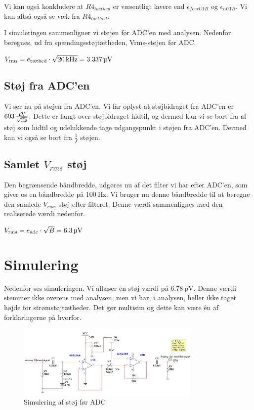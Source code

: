 \documentclass[a4paper, 11pt, article,oneside,openany]{memoir} %
\newcommand{\tsub}[1]{_{\textup{#1}}}
\begin{document}
Vi kan også konkludere at $R4_{taethed}$ er væsentligt lavere end $\epsilon_{foerU1B}$ og $\epsilon_{nU1B}$. Vi kan altså også se væk fra $R4_{taethed}$.

I simuleringen sammenligner vi støjen før ADC'en med analysen. Nedenfor beregnes, ud fra spændingsstøjtætheden, Vrms-støjen før ADC.

$V\tsub{rms} = e\tsub{tæthed} \cdot \sqrt{\SI{20}{\kilo\hertz}} = \SI{3.337}{\micro\volt}$


\subsection{Støj fra ADC'en}

Vi ser nu på støjen fra ADC'en. Vi får oplyst at støjbidraget fra ADC'en er $\SI{603}{\frac{\nano\volt}{\sqrt{\hertz}}}$. Dette er langt over støjbidraget hidtil, og dermed kan vi se bort fra al støj som hidtil og udelukkende tage udgangspunkt i støjen fra ADC'en. Dermed kan vi også se bort fra $\frac{1}{f}$ støjen.

\clearpage

\subsection{Samlet $V_{rms}$ støj}

Den begrænsende båndbredde, udgøres nu af det filter vi har efter ADC'en, som giver os en båndbredde på $\SI{100}{\hertz}$. Vi bruger nu denne båndbredde til at beregne den samlede $V_{rms}$ støj efter filteret. Denne værdi sammenlignes med den realiserede værdi nedenfor. 

$V\tsub{rms} = e\tsub{adc} \cdot \sqrt{B} = \SI{6.3}{\micro\volt}$

\section{Simulering}

Nedenfor ses simuleringen. Vi aflæser en støj-værdi på $\SI{6.78}{\pico\volt}$. 
Denne værdi stemmer ikke overens med analysen, men vi har, i analysen, heller ikke taget højde for strømstøjtætheder. Det gør multisim og dette kan være én af forklaringerne på hvorfor.

\begin{figure}[ht] %
	\centering
	\includegraphics[width=0.8\textwidth]{figure/simulering}
	\caption{Simulering af støj før ADC}
	\label{simulering}
\end{figure}
\end{document}
